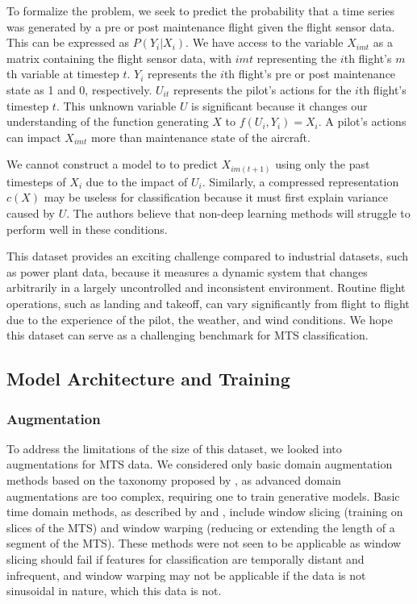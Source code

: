 \documentclass[letterpaper]{article} %
\begin{document}
To formalize the problem, we seek to predict the probability that a time series was generated by a pre or post maintenance flight given the flight sensor data. This can be expressed as \(P(Y_i | X_i)\). We have access to the variable \(X_{imt}\) as a matrix containing the flight sensor data, with \(imt\) representing the \(i\)th flight's \(m\)th variable at timestep \(t\). \(Y_i\) represents the \(i\)th flight's pre or post maintenance state as 1 and 0, respectively. \(U_{it}\) represents the pilot's actions for the \(i\)th flight's timestep \(t\). This unknown variable \(U\) is significant because it changes our understanding of the function generating \(X\) to \(f(U_i, Y_i) = X_i\). A pilot's actions can impact \(X_{imt}\) more than maintenance state of the aircraft.

We cannot construct a model to to predict \(X_{im(t+1)}\) using only the past timesteps of \(X_i\) due to the impact of \(U_i\). Similarly, a compressed representation \(c(X)\) may be useless for classification because it must first explain variance caused by \(U\). The authors believe that non-deep learning methods will struggle to perform well in these conditions.

This dataset provides an exciting challenge compared to industrial datasets, such as power plant data, because it measures a dynamic system that changes arbitrarily in a largely uncontrolled and inconsistent environment. Routine flight operations, such as landing and takeoff, can vary significantly from flight to flight due to the experience of the pilot, the weather, and wind conditions. We hope this dataset can serve as a challenging benchmark for MTS classification.

\subsection{Model Architecture and Training}

\subsubsection{Augmentation}

To address the limitations of the size of this dataset, we looked into augmentations for MTS data. We considered only basic domain augmentation methods based on the taxonomy proposed by \cite{wen2020time}, as advanced domain augmentations are too complex, requiring one to train generative models. Basic time domain methods, as described by \cite{le2016data} and \cite{wen2020time}, include window slicing (training on slices of the MTS) and window warping (reducing or extending the length of a segment of the MTS). These methods were not seen to be applicable as window slicing should fail if features for classification are temporally distant and infrequent, and window warping may not be applicable if the data is not sinusoidal in nature, which this data is not.
\end{document}

